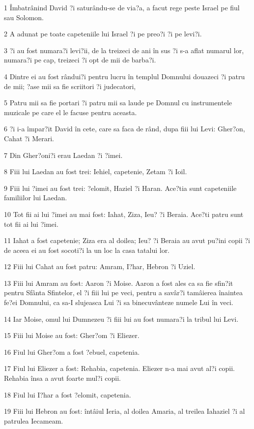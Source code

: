 \par 1 Îmbatrânind David ?i saturându-se de via?a, a facut rege peste Israel pe fiul sau Solomon.
\par 2 A adunat pe toate capeteniile lui Israel ?i pe preo?i ?i pe levi?i.
\par 3 ?i au fost numara?i levi?ii, de la treizeci de ani în sus ?i s-a aflat numarul lor, numara?i pe cap, treizeci ?i opt de mii de barba?i.
\par 4 Dintre ei au fost rândui?i pentru lucru în templul Domnului douazeci ?i patru de mii; ?ase mii sa fie scriitori ?i judecatori,
\par 5 Patru mii sa fie portari ?i patru mii sa laude pe Domnul cu instrumentele muzicale pe care el le facuse pentru aceasta.
\par 6 ?i i-a împar?it David în cete, care sa faca de rând, dupa fiii lui Levi: Gher?on, Cahat ?i Merari.
\par 7 Din Gher?oni?i erau Laedan ?i ?imei.
\par 8 Fiii lui Laedan au fost trei: Iehiel, capetenie, Zetam ?i Ioil.
\par 9 Fiii lui ?imei au fost trei: ?elomit, Haziel ?i Haran. Ace?tia sunt capeteniile familiilor lui Laedan.
\par 10 Tot fii ai lui ?imei au mai fost: Iahat, Ziza, Ieu? ?i Beraia. Ace?ti patru sunt tot fii ai lui ?imei.
\par 11 Iahat a fost capetenie; Ziza era al doilea; Ieu? ?i Beraia au avut pu?ini copii ?i de aceea ei au fost socoti?i la un loc la casa tatalui lor.
\par 12 Fiii lui Cahat au fost patru: Amram, I?har, Hebron ?i Uziel.
\par 13 Fiii lui Amram au fost: Aaron ?i Moise. Aaron a fost ales ca sa fie sfin?it pentru Sfânta Sfintelor, el ?i fiii lui pe veci, pentru a savâr?i tamâierea înaintea fe?ei Domnului, ca sa-I slujeasca Lui ?i sa binecuvânteze numele Lui în veci.
\par 14 Iar Moise, omul lui Dumnezeu ?i fiii lui au fost numara?i la tribul lui Levi.
\par 15 Fiii lui Moise au fost: Gher?om ?i Eliezer.
\par 16 Fiul lui Gher?om a fost ?ebuel, capetenia.
\par 17 Fiul lui Eliezer a fost: Rehabia, capetenia. Eliezer n-a mai avut al?i copii. Rehabia însa a avut foarte mul?i copii.
\par 18 Fiul lui I?har a fost ?elomit, capetenia.
\par 19 Fiii lui Hebron au fost: întâiul Ieria, al doilea Amaria, al treilea Iahaziel ?i al patrulea Iecameam.
